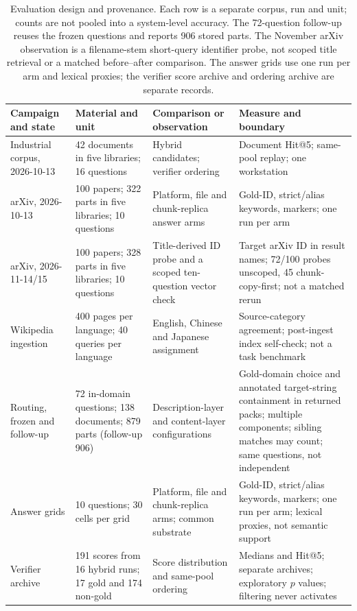 \documentclass[11pt]{article}
\begin{document}
\begin{table}
\centering
\footnotesize
\setlength{\tabcolsep}{4pt}
\caption{Evaluation design and provenance. Each row is a separate corpus, run
and unit; counts are not pooled into a system-level accuracy. The 72-question
follow-up reuses the frozen questions and reports 906 stored parts. The
November arXiv observation is a filename-stem short-query identifier probe,
not scoped title retrieval or a matched before--after comparison. The answer
grids use one run per arm and lexical proxies; the verifier score archive and
ordering archive are separate records.}

\begin{tabular}{@{}p{4cm}p{4cm}p{4cm}p{4cm}@{}}
\toprule
Campaign and state & Material and unit & Comparison or observation & Measure and boundary\\
\midrule
Industrial corpus, 2026-10-13 & 42 documents in five libraries; 16 questions & Hybrid candidates; verifier ordering & Document Hit@5; same-pool replay; one workstation\\
arXiv, 2026-10-13 & 100 papers; 322 parts in five libraries; 10 questions & Platform, file and chunk-replica answer arms & Gold-ID, strict/alias keywords, markers; one run per arm\\
arXiv, 2026-11-14/15 & 100 papers; 328 parts in five libraries; 10 questions & Title-derived ID probe and a scoped ten-question vector check & Target arXiv ID in result names; 72/100 probes unscoped, 45 chunk-copy-first; not a matched rerun\\
Wikipedia ingestion & 400 pages per language; 40 queries per language & English, Chinese and Japanese assignment & Source-category agreement; post-ingest index self-check; not a task benchmark\\
Routing, frozen and follow-up & 72 in-domain questions; 138 documents; 879 parts (follow-up 906) & Description-layer and content-layer configurations & Gold-domain choice and annotated target-string containment in returned packs; multiple components; sibling matches may count; same questions, not independent\\
Answer grids & 10 questions; 30 cells per grid & Platform, file and chunk-replica arms; common substrate & Gold-ID, strict/alias keywords, markers; one run per arm; lexical proxies, not semantic support\\
Verifier archive & 191 scores from 16 hybrid runs; 17 gold and 174 non-gold & Score distribution and same-pool ordering & Medians and Hit@5; separate archives; exploratory $p$ values; filtering never activates\\
\bottomrule
\end{tabular}
\end{table}
\end{document}
